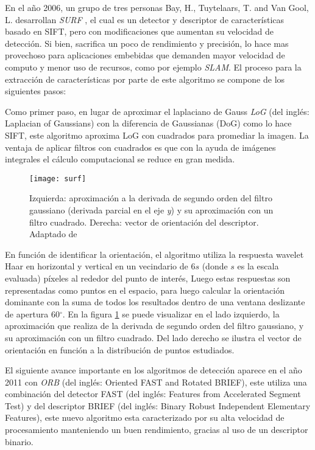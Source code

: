 En el año 2006, un grupo de tres  personas Bay, H., Tuytelaars, T. and Van Gool, L. desarrollan \textit{SURF} \cite{surf}, el cual es un detector y descriptor de características basado en SIFT, pero con modificaciones que aumentan su velocidad de detección. Si bien, sacrifica un poco de rendimiento y precisión, lo hace mas provechoso para aplicaciones embebidas que demanden mayor velocidad de computo y menor uso de recursos, como por ejemplo \textit{SLAM}. El proceso para la extracción de características por parte de este algoritmo se compone de los siguientes pasos:

Como primer paso, en lugar de aproximar el laplaciano de Gauss \textit{LoG} (del inglés: Laplacian of Gaussians) con la diferencia de Gaussianas (DoG) como lo hace SIFT, este algoritmo aproxima LoG con cuadrados para promediar la imagen. La ventaja de aplicar filtros con cuadrados es que con la ayuda de imágenes integrales el cálculo computacional se reduce en gran medida.

\begin{figure}[H]
	\centering
	\texttt{[image: surf]}
	\caption[Detector y descriptor SURF]{Izquierda: aproximación a la derivada de segundo orden del filtro gaussiano (derivada parcial en el eje \textit{y}) y su aproximación con un filtro cuadrado. Derecha: vector de orientación del descriptor. Adaptado de \cite{surf}}
	\label{imagen:surf}
\end{figure}

En función de identificar la orientación, el algoritmo utiliza la respuesta wavelet Haar en horizontal y vertical en un vecindario de 6$s$ (donde $s$ es la escala evaluada) píxeles al rededor del punto de interés, Luego estas respuestas son representadas como puntos en el espacio, para luego calcular la orientación dominante con la suma de todos los resultados dentro de una ventana deslizante de apertura 60$^\circ$. En la figura \ref{imagen:surf} se puede visualizar en el lado izquierdo, la aproximación que realiza de la derivada de segundo orden del filtro gaussiano, y su aproximación con un filtro cuadrado. Del lado derecho se ilustra el vector de orientación en función a la distribución de puntos estudiados.

El siguiente avance importante en los algoritmos de detección aparece en el año 2011 con \textit{ORB} \cite{orb} (del inglés: Oriented FAST and Rotated BRIEF), este utiliza una combinación del detector FAST (del inglés: Features from Accelerated Segment Test) y del descriptor BRIEF (del inglés: Binary Robust Independent Elementary Features), este nuevo algoritmo esta caracterizado por su alta velocidad de procesamiento manteniendo un buen rendimiento, gracias al uso de un descriptor binario. 

